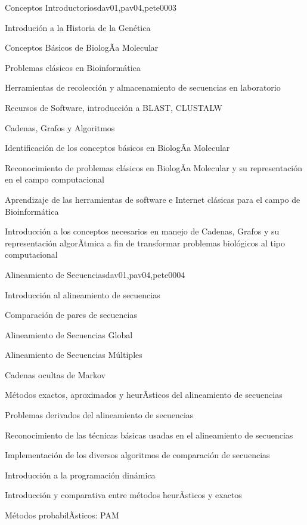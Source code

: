 \begin{syllabus}
\begin{unit}{Conceptos Introductorios}{dav01,pav04,pete00}{0}{3}
\begin{topics}
        \item Introdución a la Historia de la Genética
        \item Conceptos Básicos de BiologÃ­a Molecular
        \item Problemas clásicos en Bioinformática
        \item Herramientas de recolección y almacenamiento de secuencias en laboratorio
        \item Recursos de Software, introducción a BLAST, CLUSTALW
        \item Cadenas, Grafos y Algoritmos
    \end{topics}
    \begin{unitgoals}
        \item Identificación de los conceptos básicos en BiologÃ­a Molecular
        \item Reconocimiento de problemas clásicos en BiologÃ­a Molecular y su representación en el campo computacional
        \item Aprendizaje de las herramientas de software e Internet clásicas para el campo de Bioinformática
        \item Introducción a los conceptos necesarios en manejo de Cadenas, Grafos y su representación algorÃ­tmica a fin de transformar problemas biológicos al tipo computacional
    \end{unitgoals}
\end{unit}

\begin{unit}{Alineamiento de Secuencias}{dav01,pav04,pete00}{0}{4}
\begin{topics}
        \item Introducción al alineamiento de secuencias
        \item Comparación de pares de secuencias
        \item Alineamiento de Secuencias Global
        \item Alineamiento de Secuencias Múltiples
        \item Cadenas ocultas de Markov
        \item Métodos exactos, aproximados y heurÃ­sticos del alineamiento de secuencias
        \item Problemas derivados del alineamiento de secuencias
    \end{topics}
    \begin{unitgoals}
        \item Reconocimiento de las técnicas básicas usadas en el alineamiento de secuencias
        \item Implementación de los diversos algoritmos de comparación de secuencias
        \item Introducción a la programación dinámica
        \item Introducción y comparativa entre métodos heurÃ­sticos y exactos
        \item Métodos probabilÃ­sticos: PAM
    \end{unitgoals}
\end{unit}


\end{syllabus}
